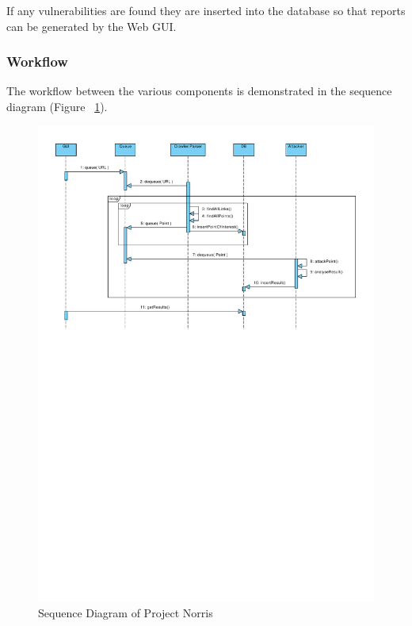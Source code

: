 \documentclass[12pt,a4paper]{article}
\begin{document}
If any vulnerabilities are found they are inserted into the database so that reports can be generated by the Web GUI.

\subsubsection{Workflow}
The workflow between the various components is demonstrated in the sequence diagram (Figure ~\ref{fig:workflow}).

\begin{figure}[!ht]
    \begin{center}
        \includegraphics[angle=90]{images/system_sequence_diagram.pdf}    
    \end{center}
    \caption{Sequence Diagram of Project Norris}
    \label{fig:workflow}
\end{figure}
\end{document}
